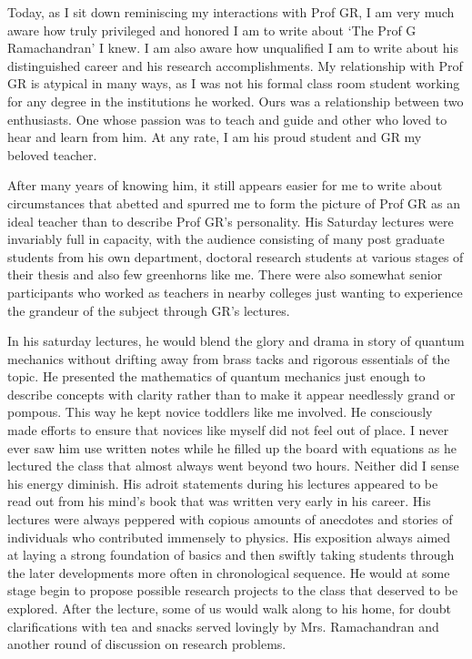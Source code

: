 Today, as I sit down reminiscing my interactions with Prof GR, I am very much
aware how truly privileged and honored I am to write about `The Prof G
Ramachandran' I knew. I am also aware how unqualified I am to write about his
distinguished career and his research accomplishments. My relationship with Prof
GR is atypical in many ways, as I was not his formal class room student working
for any degree in the institutions he worked. Ours was a relationship between two
enthusiasts. One whose passion was to teach and guide and other who loved to
hear and learn from him. At any rate, I am his proud student and GR my beloved
teacher.

After many years of knowing him, it still appears easier for me to write about
circumstances that abetted and spurred me to form the picture of Prof GR as an
ideal teacher than to describe Prof GR's personality. His Saturday lectures were
invariably full in capacity, with the audience consisting of many post graduate
students from his own department, doctoral research students at various stages of
their thesis and also few greenhorns like me. There were also somewhat senior
participants who worked as teachers in nearby colleges just wanting to experience
the grandeur of the subject through GR's lectures.

In his saturday lectures, he would blend the glory and drama in story of quantum
mechanics without drifting away from brass tacks and rigorous essentials of the
topic. He presented the mathematics of quantum mechanics just enough to
describe concepts with clarity rather than to make it appear needlessly grand or
pompous. This way he kept novice toddlers like me involved. He consciously
made efforts to ensure that novices like myself did not feel out of place. I never
ever saw him use written notes while he filled up the board with equations as he
lectured the class that almost always went beyond two hours. Neither did I sense
his energy diminish. His adroit statements during his lectures appeared to be read
out from his mind's book that was written very early in his career. His lectures
were always peppered with copious amounts of anecdotes and stories of
individuals who contributed immensely to physics. His exposition always aimed
at laying a strong foundation of basics and then swiftly taking students through
the later developments more often in chronological sequence. He would at some
stage begin to propose possible research projects to the class that deserved to be
explored. After the lecture, some of us would walk along to his home, for doubt
clarifications with tea and snacks served lovingly by Mrs. Ramachandran and
another round of discussion on research problems.


